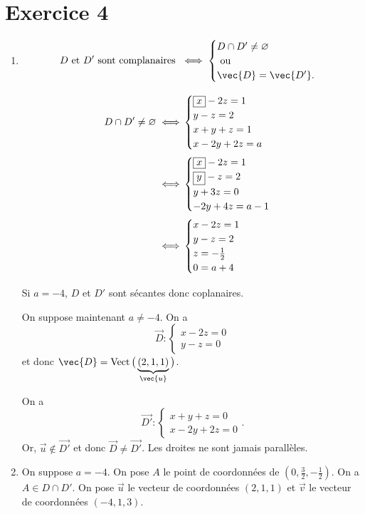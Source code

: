 \part{Exercice 4}

\begin{enumerate}
	\item \[
			D \text{ et } D' \text{ sont complanaires } \iff \begin{cases}
				 D \cap D' \neq \O\\
				 \ou\\
				 \vec{D} = \vec{D'}.
			\end{cases}
		\]

		\begin{align*}
			D\cap D' \neq \varnothing \iff&
			\begin{cases}
				\boxed x - 2z = 1\\
				y-z = 2\\
				x + y + z = 1\\
				x - 2y + 2z = a\\
			\end{cases}\\
			\iff& \begin{cases}
				\boxed x - 2z = 1\\
				\boxed y - z = 2\\
				y + 3z = 0\\
				-2y + 4z = a - 1
			\end{cases}\\
			\iff& \begin{cases}
				 x - 2z = 1\\
				 y - z = 2\\
				 z = -\frac{1}{2}\\
				 0 = a + 4
			\end{cases}
		\end{align*}

		Si $a = -4$, $D$ et $D'$ sont sécantes donc coplanaires.

		On suppose maintenant $a \neq -4$. On a \[
			\vec{D} : \begin{cases}
				x - 2z = 0\\
				y - z = 0
			\end{cases}
		\] et donc $\vec{D} = \Vect\big(\underbrace{(2,1,1)}_{\vec{u}}\big)$.

		On a \[
			\vec{D'} : \begin{cases}
				 x + y + z = 0\\
				 x - 2y + 2z = 0
			\end{cases}
		.\] Or, $\vec{u} \not\in \vec{D'}$ et donc $\vec{D} \neq \vec{D'}$. Les droites ne sont jamais parallèles.
	\item On suppose $a = -4$. On pose $A$ le point de coordonnées de $\left( 0, \frac{3}{2}, -\frac{1}{2} \right)$. On a $A \in D\cap D'$. On pose $\vec{u}$ le vecteur de coordonnées $(2, 1, 1)$ et $\vec{v}$ le vecteur de coordonnées $(-4, 1, 3)$.


\end{enumerate}
